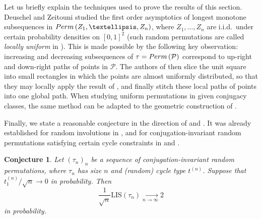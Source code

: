 \documentclass{article}
\newtheorem{conj}[theorem]{Conjecture}
\theoremstyle{remark}
\newcommand{\cv}[2]{\underset{#1\to#2}{\longrightarrow}}
\def\LIS{\mathrm{LIS}}
\def\carre{[0,1]^2}
\def\pts{\mathcal{P}}
\newcommand{\perm}[1]{{\rm Perm}\left(#1\right)}
\begin{document}
Let us briefly explain the techniques used to prove the results of this section.
Deuschel and Zeitouni \cite{DZ95} studied the first order asymptotics of longest monotone subsequences in $\perm{Z_1,\dots,Z_n}$, where $Z_1,\dots,Z_n$ are i.i.d.~under certain probability densities on $\carre$ (such random permutations are called {\em locally uniform} in \cite{S23}).
This is made possible by the following key observation: 
increasing and decreasing subsequences of $\tau=\perm{\pts}$ correspond to up-right and down-right paths of points in $\pts$.
The authors of \cite{DZ95} then slice the unit square into small rectangles in which the points are almost uniformly distributed, so that they may locally apply the result of \cite{VK77}, and finally stitch these local paths of points into one global path.
When studying uniform permutations in given conjugacy classes, the same method can be adapted to the geometric construction of .

Finally, we state a reasonable conjecture in the direction of  and .
It was already established for random involutions in \cite{BR01}, and for conjugation-invariant random permutations satisfying certain cycle constraints in \cite[Theorem~1.2]{K18} and \cite[Theorem~3]{K23}.

\begin{conj}\label{conj: LIS conjugation-invariant w/o fixed points}
    Let $(\tau_n)_n$ be a sequence of conjugation-invariant random permutations, where $\tau_n$ has size $n$ and (random) cycle type $t^{(n)}$.
    Suppose that $t_1^{(n)}/\sqrt{n}\rightarrow0$ in probability.
    Then
    \begin{equation*}
        \frac{1}{\sqrt{n}}\LIS(\tau_n) \cv{n}{\infty} 2
    \end{equation*}
    in probability.
\end{conj}
\end{document}
